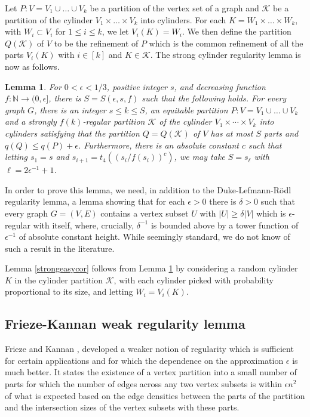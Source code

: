 \documentclass[11pt]{article}
\newtheorem{lemma}{Lemma}[section]
\begin{document}
Let $P : V = V_1 \cup \dots \cup V_k$ be a partition of the vertex set of a
graph and $\mathcal{K}$ be a partition of the cylinder $V_1 \times \dots \times
V_k$ into cylinders. For each $K = W_1 \times \dots \times W_k$, with $W_i
\subset V_i$ for $1 \leq i \leq k$, we let $V_i(K) = W_i$. We then define the
partition  $Q(\mathcal{K})$ of $V$ to be the refinement of $P$ which is the
common refinement of all the parts $V_i(K)$ with $i \in [k]$ and $K \in
\mathcal{K}$. The strong cylinder regularity lemma is now as
follows.

\begin{lemma}\label{scrl} For $0<\epsilon<1/3$, positive integer $s$, and decreasing function $f:\mathbb{N} \rightarrow
(0,\epsilon]$, there is $S=S(\epsilon,s,f)$ such that the following holds. For every
graph $G$, there is an integer $s \leq k \leq S$, an equitable  partition $P:V=V_1 \cup
\ldots \cup V_k$ and a strongly $f(k)$-regular partition $\mathcal{K}$ of the
cylinder $V_1 \times \cdots \times V_k$ into cylinders satisfying that the
partition $Q=Q(\mathcal{K})$ of $V$ has at most $S$ parts and $q(Q) \leq
q(P)+\epsilon$. Furthermore, there is an absolute constant $c$ such that
letting $s_1=s$ and $s_{i+1}=t_4\left(\left(s_i/f(s_i)\right)^c\right)$, we may
take $S=s_{\ell}$ with $\ell=2\epsilon^{-1}+1$.

\end{lemma}

In order to prove this lemma, we need, in addition to the Duke-Lefmann-R\"odl
regularity lemma, a lemma showing that for each $\epsilon > 0$ there is $\delta
> 0$ such that every graph $G = (V, E)$ contains a vertex subset $U$ with $|U|
\geq \delta |V|$ which is $\epsilon$-regular with itself, where, crucially,
$\delta^{-1}$ is bounded above by a tower function of $\epsilon^{-1}$ of
absolute constant height. While seemingly standard, we do not know of such a result in the literature. 

Lemma \ref{strongeasycor} follows from Lemma \ref{scrl} by considering a random cylinder $K$ in the cylinder partition $\mathcal{K}$, with each cylinder picked with probability proportional to its size, and letting $W_i=V_i(K)$. 

\subsection{Frieze-Kannan weak regularity lemma}

Frieze and Kannan \cite{FrKa}, \cite{FrKa1} developed a weaker notion of
regularity which is sufficient for certain applications and for which the
dependence on the approximation $\epsilon$ is much better. It states the
existence of a vertex partition into a small number of parts for which the
number of edges across any two vertex subsets is within $\epsilon n^2$ of what
is expected based on the edge densities between the parts of the partition and
the intersection sizes of the vertex subsets with these parts.
\end{document}
